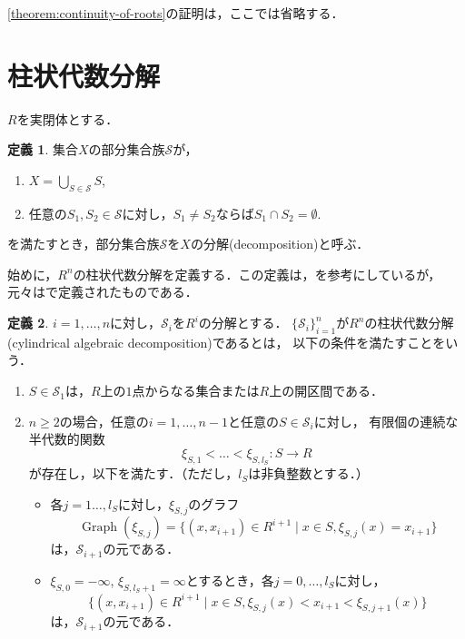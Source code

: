 \documentclass[uplatex, dvipdfmx]{jsarticle}
\numberwithin{equation}{section}
\newcommand{\map}[3]{{#1}\colon{#2}\rightarrow{#3}}
\DeclareMathOperator{\Graph}{Graph}
\theoremstyle{definition}
\newtheorem{definition}{定義}[section]
\begin{document}
\cref{theorem:continuity-of-roots}の証明は，ここでは省略する．

\section{柱状代数分解}\label{section:6}

$R$を実閉体とする．

\begin{definition}
     集合$X$の部分集合族$\mathcal{S}$が，
     \begin{enumerate}
          \item $X = \bigcup_{S \in \mathcal{S}} S$,
          \item 任意の$S_1, S_2 \in \mathcal{S}$に対し，$S_1 \neq S_2$ならば$S_1 \cap S_2 = \emptyset$.
     \end{enumerate}
を満たすとき，部分集合族$\mathcal{S}$を$X$の分解(decomposition)と呼ぶ．
\end{definition}

始めに，$R^n$の柱状代数分解を定義する．この定義は，\cite[Definition 5.1]{MR2248869}を参考にしているが，
元々は\cite[section 3]{MR0403962}で定義されたものである．

\begin{definition} \label{definition:cad}
     $i=1, \dots, n$に対し，$\mathcal{S}_i$を$R^i$の分解とする．
     $\{\mathcal{S}_i\}_{i=1}^n$が$R^n$の柱状代数分解(cylindrical algebraic decomposition)であるとは，
     以下の条件を満たすことをいう．
     \begin{enumerate}
          \item $S \in \mathcal{S}_1$は，$R$上の$1$点からなる集合または$R$上の開区間である．
          \item $n\geq 2$の場合，任意の$i=1, \dots, n-1$と任意の$S \in \mathcal{S}_i$に対し，
          有限個の連続な半代数的関数
          \begin{equation}
               \map{\xi_{S,1}< \dots <\xi_{S,l_S}}{S}{R}
          \end{equation}
          が存在し，以下を満たす．（ただし，$l_S$は非負整数とする．）
          \begin{itemize}
               \item 各$j=1 \dots, l_S$に対し，$\xi_{S,j}$のグラフ
               \begin{equation}
                    \Graph(\xi_{S,j}) = \{(x,x_{i+1}) \in R^{i+1} \mid x \in S, \xi_{S,j}(x)=x_{i+1} \}
               \end{equation}
               は，$\mathcal{S}_{i+1}$の元である．
               \item $\xi_{S,0}=-\infty$, $\xi_{S,l_S+1}=\infty$とするとき，各$j=0, \dots, l_S$に対し，\label{cad_condition1}
               \begin{equation}
                    \{(x,x_{i+1}) \in R^{i+1} \mid x \in S, \xi_{S,j}(x)<x_{i+1}<\xi_{S,j+1}(x) \}
               \end{equation}
               は，$\mathcal{S}_{i+1}$の元である．
          \end{itemize}
     \end{enumerate}
\end{definition}
\end{document}

